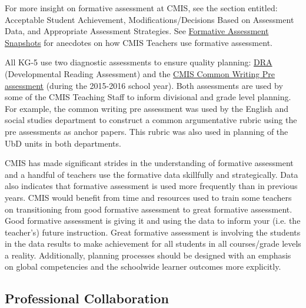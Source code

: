 \documentclass{report}
\begin{document}
\begin{findings}
For more insight on formative assessment at CMIS, see the section entitled: Acceptable Student Achievement, Modifications/Decisions Based on Assessment Data, and Appropriate Assessment Strategies. See \href{https://docs.google.com/a/cmis.ac.th/document/d/1yPhINDe21ApcJp3psbSCgmS9PHEBbxrCflrR2Adnwho/edit?usp=sharing}{Formative Assessment Snapshots} for anecdotes on how CMIS Teachers use formative assessment. 


All KG-5 use two diagnostic assessments to ensure quality planning: \href{https://drive.google.com/drive/folders/0ByVFfrm0zfolV29lcmM1WXVQOXc?usp=sharing}{DRA} (Developmental Reading Assessment) and the \href{https://drive.google.com/drive/folders/0ByVFfrm0zfolLU9Vb0ZBeF9uZjQ?usp=sharing}{CMIS Common Writing Pre assessment} (during the 2015-2016 school year). Both assessments are used by some of the CMIS Teaching Staff to inform divisional and grade level planning. For example, the common writing pre assessment was used by the English and social studies department to construct a common argumentative rubric using the pre assessments as anchor papers. This rubric was also used in planning of the UbD units in both departments. 


CMIS has made significant strides in the understanding of formative assessment and a handful of teachers use the formative data skillfully and strategically. Data also indicates that formative assessment is used more frequently than in previous years. CMIS would benefit from time and resources used to train some teachers on transitioning from good formative assessment to great formative assessment. Good formative assessment is giving it and using the data to inform your (i.e. the teacher’s) future instruction. Great formative assessment is involving the students in the data results to make achievement for all students in all courses/grade levels a reality. Additionally, planning processes should be designed with an emphasis on global competencies and the schoolwide learner outcomes more explicitly. 
\end{findings}

\subsection{Professional Collaboration}

\end{document}
